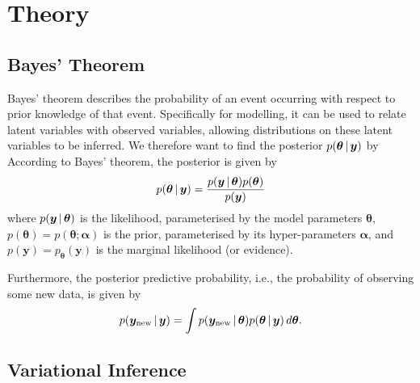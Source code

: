 \chapter{Theory}

\section{Bayes’ Theorem}

Bayes' theorem describes the probability of an event occurring with respect to prior knowledge of that event.
Specifically for modelling, it can be used to relate latent variables with observed variables, allowing distributions on these latent variables to be inferred.
We therefore want to find the posterior \(p(\bm \theta \, | \, \bm y)\) by
According to Bayes' theorem, the posterior is given by
\begin{align}\label{eq:bayes}
    p(\bm \theta \, | \, \bm y) = \frac{p(\bm y \, | \, \bm \theta) p(\bm \theta)}{p(\bm y)}
\end{align}
where \(p(\bm y \, | \, \bm \theta)\) is the likelihood, parameterised by the model parameters \(\bm \theta\), \(p(\bm \theta) = p(\bm \theta; \bm \alpha)\) is the prior, parameterised by its hyper-parameters \(\bm \alpha\), and \(p(\bm y) = p_{\bm \theta}(\bm y)\) is the marginal likelihood (or evidence).

Furthermore, the posterior predictive probability, i.e., the probability of observing some new data, is given by
\begin{align}
    p(\bm y_{\mathrm{new}} \, | \, \bm y) = \int p(\bm y_{\mathrm{new}} \, | \, \bm \theta) p(\bm \theta \, | \, \bm y)\,d\bm\theta.
\end{align}

\section{Variational Inference}

